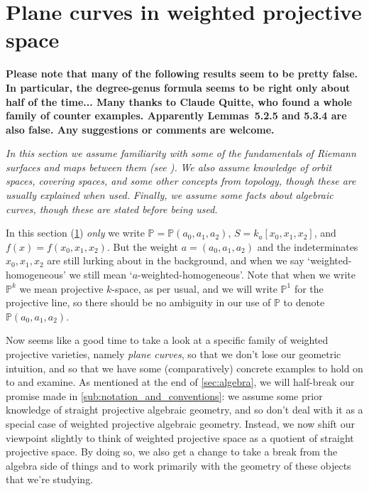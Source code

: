 \documentclass[10pt,notitlepage]{article}
\numberwithin{equation}{subsection}
\newcommand{\pee}{\mathbb{P}}
\newcommand{\kathree}{k_a[x_0,x_1,x_2]}
\newcommand{\pathree}{\pee(a_0,a_1,a_2)}
\newcommand{\poly}{S}
\begin{document}





\section{Plane curves in weighted projective space} %
\label{sec:curves_in_weighted_projective_space}

    {\color{red}\textbf{Please note that many of the following results seem to be pretty false. In particular, the degree-genus formula seems to be right only about half of the time... Many thanks to Claude Quitte, who found a whole family of counter examples. Apparently Lemmas~5.2.5 and 5.3.4 are also false. Any suggestions or comments are welcome.}}

    \bigskip


    \emph{In this section we assume familiarity with some of the fundamentals of Riemann surfaces and maps between them (see \cite[Chapters~1,~2]{Miranda:1995uz}).}
    \emph{We also assume knowledge of orbit spaces, covering spaces, and some other concepts from topology, though these are usually explained when used.}
    \emph{Finally, we assume some facts about algebraic curves, though these are stated before being used.}

    \bigskip

    \begin{note}
        In this section (\cref{sec:curves_in_weighted_projective_space}) \emph{only} we write $\pee=\pathree$, $\poly=\kathree$, and $f(x)=f(x_0,x_1,x_2)$.
        But the weight \mbox{$a=(a_0,a_1,a_2)$} and the indeterminates $x_0,x_1,x_2$ are still lurking about in the background, and when we say `weighted-homogeneous' we still mean `$a$-weighted-homogeneous'.
        Note that when we write $\pee^k$ we mean projective $k$-space, as per usual, and we will write $\pee^1$ for the projective line, so there should be no ambiguity in our use of $\pee$ to denote $\pee(a_0,a_1,a_2)$.
    \end{note}
    Now seems like a good time to take a look at a specific family of weighted projective varieties, namely \emph{plane curves}, so that we don't lose our geometric intuition, and so that we have some (comparatively) concrete examples to hold on to and examine.
    As mentioned at the end of \cref{sec:algebra}, we will half-break our promise made in \cref{sub:notation_and_conventions}: we assume some prior knowledge of straight projective algebraic geometry, and so don't deal with it as a special case of weighted projective algebraic geometry.
    Instead, we now shift our viewpoint slightly to think of weighted projective space as a quotient of straight projective space.
    By doing so, we also get a change to take a break from the algebra side of things and to work primarily with the geometry of these objects that we're studying.
\end{document}
